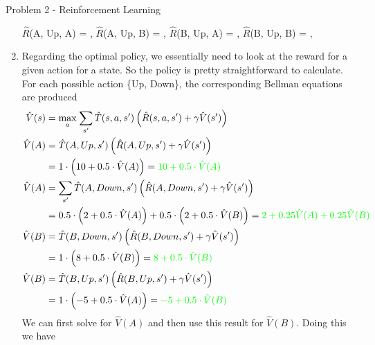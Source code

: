 \begin{problem}{Problem 2 - Reinforcement Learning}
\begin{highlight}
\begin{enumerate}[label=(\alph*)]
\begin{center}
            \end{center}
            \begin{center}
                $\hat{R}$(A, Up, A) = \underline{\color{green}{-1}}, \hspace*{2pt} $\hat{R}$(A, Up, B) = \underline{\color{green}{n/a}}, \hspace*{2pt} $\hat{R}$(B, Up, A) = \underline{\color{green}{3}}, \hspace*{2pt} $\hat{R}$(B, Up, B) = \underline{\color{green}{0}}, \hspace*{2pt}
            \end{center}
            \item Regarding the optimal policy, we essentially need to look at the reward for a given action for a state. So the policy is pretty straightforward to calculate. For each possible action 
            \{Up, Down\}, the corresponding Bellman equations are produced
            \begin{align*}
                \hat{V}(s) & = \underset{a}{\text{max}} \hspace*{1pt} \sum_{s'} \hat{T}(s,a,s')\left(\hat{R}(s,a,s') + \gamma\hat{V}(s')\right) \\
                \hat{V}(A) & = \hat{T}(A,Up,s')\left(\hat{R}(A,Up,s') + \gamma\hat{V}(s')\right) \\
                & = 1 \cdot \left(10 + 0.5 \cdot \hat{V}(A)\right) = \color{green}{10 + 0.5 \cdot \hat{V}(A)} \\
                \hat{V}(A) & = \sum_{s'} \hat{T}(A,Down,s')\left(\hat{R}(A,Down,s') + \gamma\hat{V}(s')\right) \\
                & = 0.5 \cdot \left(2 + 0.5 \cdot \hat{V}(A)\right) + 0.5 \cdot \left(2 + 0.5 \cdot \hat{V}(B)\right) = \color{green}{2 + 0.25\hat{V}(A) + 0.25\hat{V}(B)} \\
                \hat{V}(B) & = \hat{T}(B,Down,s')\left(\hat{R}(B,Down,s') + \gamma\hat{V}(s')\right) \\
                & = 1 \cdot \left(8 + 0.5 \cdot \hat{V}(B)\right) = \color{green}{8 + 0.5 \cdot \hat{V}(B)} \\
                \hat{V}(B) & = \hat{T}(B,Up,s')\left(\hat{R}(B,Up,s') + \gamma\hat{V}(s')\right) \\
                & = 1 \cdot \left(-5 + 0.5 \cdot \hat{V}(A)\right) = \color{green}{-5 + 0.5 \cdot \hat{V}(B)} \\
            \end{align*}
            We can first solve for $\hat{V}(A)$ and then use this result for $\hat{V}(B)$. Doing this we have

\end{enumerate}
\end{highlight}
\end{problem}
